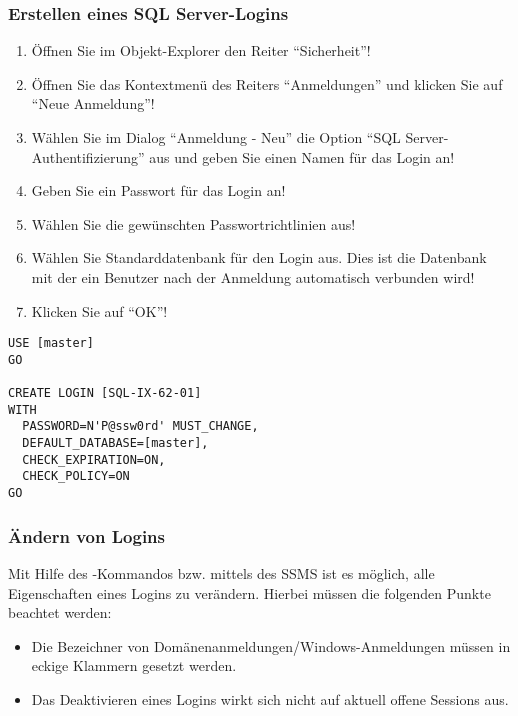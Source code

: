         \subsubsection{Erstellen eines SQL Server-Logins}
          \begin{enumerate}
            \item Öffnen Sie im Objekt-Explorer den Reiter \enquote{Sicherheit}! 
            \item Öffnen Sie das Kontextmenü des Reiters \enquote{Anmeldungen}
            und klicken Sie auf \enquote{Neue Anmeldung}!
            \item Wählen Sie im Dialog \enquote{Anmeldung - Neu} die Option
            \enquote{SQL Server-Authentifizierung} aus und geben Sie einen Namen
            für das Login an!
            \item Geben Sie ein Passwort für das Login an!
            \item Wählen Sie die gewünschten Passwortrichtlinien aus!
            \item Wählen Sie Standarddatenbank für den Login aus. Dies ist die
            Datenbank mit der ein Benutzer nach der Anmeldung automatisch
            verbunden wird!
            \item Klicken Sie auf \enquote{OK}!
          \end{enumerate}
          \begin{lstlisting}[language=ms_sql, caption={Anlegen eines SQL
          Server-Logins mit T-SQL}, label=admin19_09]
USE [master]
GO

CREATE LOGIN [SQL-IX-62-01] 
WITH 
  PASSWORD=N'P@ssw0rd' MUST_CHANGE, 
  DEFAULT_DATABASE=[master], 
  CHECK_EXPIRATION=ON, 
  CHECK_POLICY=ON
GO
        \end{lstlisting}
\clearpage
        \subsubsection{Ändern von Logins}
          Mit Hilfe des -Kommandos bzw. mittels
          des SSMS ist es möglich, alle Eigenschaften eines Logins zu verändern.
          Hierbei müssen die folgenden Punkte beachtet werden:
          \begin{itemize}
            \item Die Bezeichner von Domänenanmeldungen/Windows-Anmeldungen
            müssen in eckige Klammern gesetzt werden.
            \item Das Deaktivieren eines Logins wirkt sich nicht auf aktuell
            offene Sessions aus.
          \end{itemize}
          \begin{literaturinternet}
            \item \cite{ms189828}
          \end{literaturinternet}
